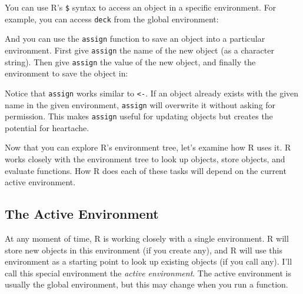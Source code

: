 \documentclass[
  letterpaper,
  DIV=11,
  numbers=noendperiod]{scrbook}
\newenvironment{Shaded}{\begin{snugshade}}{\end{snugshade}}
\newcommand{\AttributeTok}[1]{\textcolor[rgb]{0.40,0.45,0.13}{#1}}
\newcommand{\DecValTok}[1]{\textcolor[rgb]{0.68,0.00,0.00}{#1}}
\newcommand{\DocumentationTok}[1]{\textcolor[rgb]{0.37,0.37,0.37}{\textit{#1}}}
\newcommand{\FunctionTok}[1]{\textcolor[rgb]{0.28,0.35,0.67}{#1}}
\newcommand{\NormalTok}[1]{\textcolor[rgb]{0.00,0.23,0.31}{#1}}
\newcommand{\SpecialCharTok}[1]{\textcolor[rgb]{0.37,0.37,0.37}{#1}}
\newcommand{\StringTok}[1]{\textcolor[rgb]{0.13,0.47,0.30}{#1}}
\begin{document}
You can use R's \texttt{\$} syntax to access an object in a specific
environment. For example, you can access \texttt{deck} from the global
environment:

\begin{Shaded}
\end{Shaded}

And you can use the \texttt{assign} function to save an object into a
particular environment. First give \texttt{assign} the name of the new
object (as a character string). Then give \texttt{assign} the value of
the new object, and finally the environment to save the object in:

\begin{Shaded}
\end{Shaded}

Notice that \texttt{assign} works similar to \texttt{\textless{}-}. If
an object already exists with the given name in the given environment,
\texttt{assign} will overwrite it without asking for permission. This
makes \texttt{assign} useful for updating objects but creates the
potential for heartache.

Now that you can explore R's environment tree, let's examine how R uses
it. R works closely with the environment tree to look up objects, store
objects, and evaluate functions. How R does each of these tasks will
depend on the current active environment.

\subsection{The Active Environment}\label{the-active-environment}

At any moment of time, R is working closely with a single environment. R
will store new objects in this environment (if you create any), and R
will use this environment as a starting point to look up existing
objects (if you call any). I'll call this special environment the
\emph{active environment}. The active environment is usually the global
environment, but this may change when you run a function.
\end{document}
